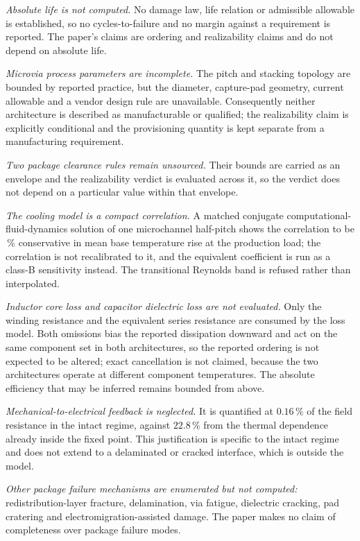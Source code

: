 \documentclass[journal]{IEEEtran}
\begin{document}
\emph{Absolute life is not computed.} No damage law, life relation or admissible allowable is
established, so no cycles-to-failure and no margin against a requirement is reported. The
paper's claims are ordering and realizability claims and do not depend on absolute life.

\emph{Microvia process parameters are incomplete.} The pitch and stacking topology are
bounded by reported practice, but the diameter, capture-pad geometry, current allowable and a
vendor design rule are unavailable. Consequently neither architecture is described as
manufacturable or qualified; the realizability claim is explicitly conditional and the
provisioning quantity is kept separate from a manufacturing requirement.

\emph{Two package clearance rules remain unsourced.} Their bounds are carried as an envelope
and the realizability verdict is evaluated across it, so the verdict does not depend on a
particular value within that envelope.

\emph{The cooling model is a compact correlation.} A matched conjugate
computational-fluid-dynamics solution of one microchannel half-pitch shows the correlation to be
\ErrCoolingIcepak\,\% conservative in mean base temperature rise at the production load; the
correlation is not recalibrated to it, and the equivalent coefficient is run as a class-B
sensitivity instead. The transitional Reynolds band is refused rather than interpolated.

\emph{Inductor core loss and capacitor dielectric loss are not evaluated.} Only the winding
resistance and the equivalent series resistance are consumed by the loss model. Both
omissions bias the reported dissipation downward and act on the same component set in both
architectures, so the reported ordering is not expected to be altered; exact cancellation is
not claimed, because the two architectures operate at different component temperatures. The
absolute efficiency that may be inferred remains bounded from above.

\emph{Mechanical-to-electrical feedback is neglected.} It is quantified at $0.16$\,\% of the
field resistance in the intact regime, against $22.8$\,\% from the thermal dependence already
inside the fixed point. This justification is specific to the intact regime and does not
extend to a delaminated or cracked interface, which is outside the model.

\emph{Other package failure mechanisms are enumerated but not computed:}
redistribution-layer fracture, delamination, via fatigue, dielectric cracking, pad cratering
and electromigration-assisted damage. The paper makes no claim of completeness over package
failure modes.
\end{document}

